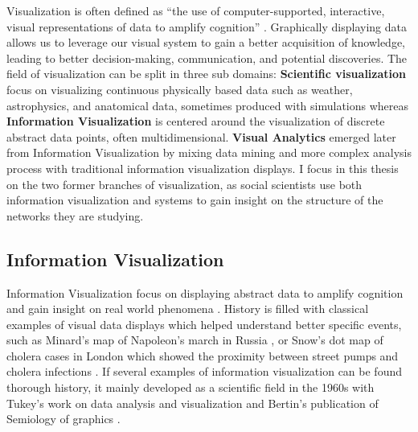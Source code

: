 Visualization is often defined as ``the use of computer-supported, interactive, visual representations of data to amplify cognition'' \cite{cardReadingsInformationVisualization1999}.
Graphically displaying data allows us to leverage our visual system to gain a better acquisition of knowledge, leading to better decision-making, communication, and potential discoveries.
The field of visualization can be split in three sub domains: \textbf{Scientific visualization} focus on visualizing continuous physically based data such as weather, astrophysics, and anatomical data, sometimes produced with simulations whereas \textbf{Information Visualization} is centered around the visualization of discrete abstract data points, often multidimensional. \textbf{Visual Analytics} emerged later from Information Visualization by mixing data mining and more complex analysis process with traditional information visualization displays.
I focus in this thesis on the two former branches of visualization, as social scientists use both information visualization and \va systems to gain insight on the structure of the networks they are studying.


\subsection{Information Visualization}

Information Visualization focus on displaying abstract data to amplify cognition and gain insight on real world phenomena \cite{cardReadingsInformationVisualization1999}.
History is filled with classical examples of visual data displays which helped understand better specific events, such as Minard's map of Napoleon's march in Russia \cite{friendlyVisionsReVisionsCharles2002}, or Snow's dot map of cholera cases in London which showed the proximity between street pumps and cholera infections \cite{snowModeCommunicationCholera1856}.
If several examples of information visualization can be found thorough history, it mainly developed as a scientific field in the 1960s with Tukey's work on data analysis and visualization \cite{tukeyFutureDataAnalysis1962} and Bertin's publication of Semiology of graphics \cite{bertin1967}.


